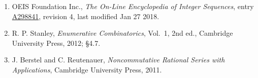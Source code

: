 \documentclass[11pt]{article}
\theoremstyle{definition}
\begin{document}
\begin{enumerate}

\item OEIS Foundation Inc., \emph{The On-Line Encyclopedia of Integer Sequences}, entry \href{https://oeis.org/A298841}{A298841}, revision 4, last modified Jan 27 2018.

\item R. P. Stanley, \emph{Enumerative Combinatorics}, Vol.~1, 2nd ed., Cambridge University Press, 2012; \S4.7.

\item J. Berstel and C. Reutenauer, \emph{Noncommutative Rational Series with Applications}, Cambridge University Press, 2011.

\end{enumerate}
\end{document}
